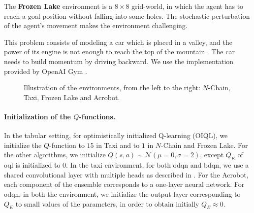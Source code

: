 The \textbf{Frozen Lake} environment is a $8\times 8$ grid-world, in which the agent has to reach a goal position without falling into some holes. The stochastic perturbation of the agent's movement makes the environment challenging.

This problem consists of modeling a car which is placed in a valley, and the power of its engine is not enough to reach the top of the mountain \cite{moore1990efficient}. The car needs to build momentum by driving backward. We use the implementation provided by OpenAI Gym \cite{brockman2016openai}.

\begin{figure*}[t]
  \centering
  \caption{Illustration of the environments, from the left to the right: $N$-Chain,  Taxi, Frozen Lake and Acrobot. }
\end{figure*}

\paragraph{Initialization of the $Q$-functions.} In the tabular setting, for optimistically initialized Q-learning (OIQL), we initialize the $Q$-function to $15$ in Taxi and to $1$ in $N$-Chain and Frozen Lake. For the other algorithms, we initialize $Q(s,a) \sim \mathcal{N}(\mu=0,\sigma=2)$, except $Q_E$ of \gls{oql} is initialized to $0$.
In the taxi environment, for both \gls{odqn} and \gls{bdqn}, we use a shared convolutional layer with multiple heads as described in \cite{osband2016deep}. For the Acrobot, each component of the ensemble corresponds to a one-layer neural network. For \gls{odqn}, in both the environment, we initialize the output layer corresponding to $Q_E$ to small values of the parameters, in order to obtain initially $Q_E \approx 0$. 

